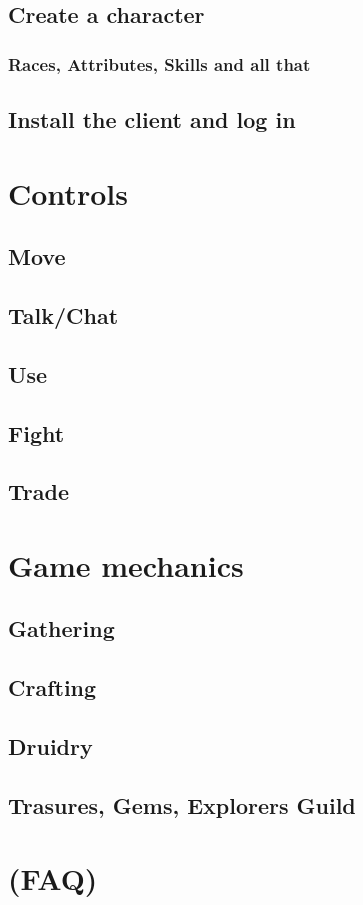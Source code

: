 \documentclass[a4paper,11pt]{scrreprt}
\begin{document}
\section{Create a character}
\subsection{Races, Attributes, Skills and all that}
\section{Install the client and log in}

\chapter{Controls}
\section{Move}
\section{Talk/Chat}
\section{Use}
\section{Fight}
\section{Trade}
\section{}

\chapter{Game mechanics}
\section{Gathering}
\section{Crafting}
\section{Druidry}
\section{Trasures, Gems, Explorers Guild}

\chapter{(FAQ)}
\end{document}
